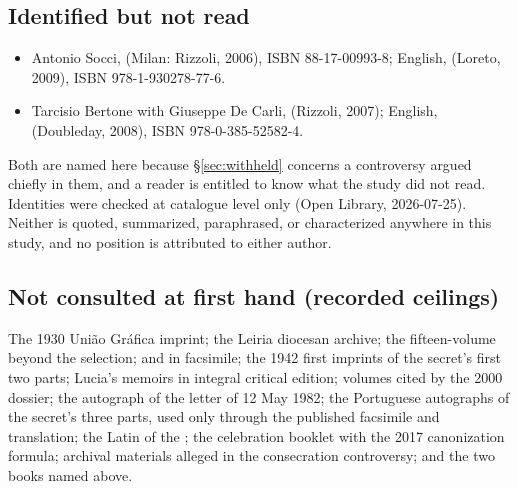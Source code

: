 \subsection*{Identified but not read}

\begin{itemize}
\item Antonio Socci,  (Milan:
Rizzoli, 2006), ISBN 88-17-00993-8; English,  (Loreto, 2009), ISBN 978-1-930278-77-6.
\item Tarcisio Bertone with Giuseppe De Carli,  (Rizzoli, 2007); English,  (Doubleday, 2008), ISBN 978-0-385-52582-4.
\end{itemize}

Both are named here because \S\ref{sec:withheld} concerns a
controversy argued chiefly in them, and a reader is entitled to know
what the study did not read. Identities were checked at catalogue
level only (Open Library, 2026-07-25). Neither is quoted,
summarized, paraphrased, or characterized anywhere in this study, and
no position is attributed to either author.

\subsection*{Not consulted at first hand (recorded ceilings)}

The 1930 Uni\~ao Gr\'afica imprint; the Leiria diocesan archive; the
fifteen-volume  beyond the
selection;  and 
in facsimile; the 1942 first imprints of the secret's first two
parts; Lucia's memoirs in integral critical edition;
 volumes cited by the 2000 dossier; the autograph
of the letter of 12 May 1982; the Portuguese autographs of the
secret's three parts, used only through the published facsimile and
translation; the Latin of the ; the
celebration booklet with the 2017 canonization formula; archival
materials alleged in the consecration controversy; and the two books
named above.

